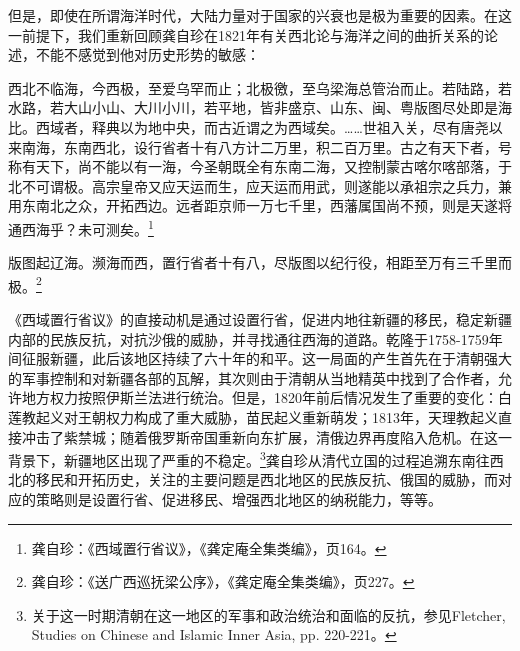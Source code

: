 \documentclass[a4paper, 12pt, openright]{ctexbook}
\renewenvironment{quote}
  {\list{}{\rightmargin2\ccwd \leftmargin2\ccwd \itemindent=2\ccwd \listparindent=2\ccwd}%
   \item\relax\small\kaishu\color{black}}
  {\endlist}
\begin{document}
但是，即使在所谓海洋时代，大陆力量对于国家的兴衰也是极为重要的因素。在这一前提下，我们重新回顾龚自珍在1821年有关西北论与海洋之间的曲折关系的论述，不能不感觉到他对历史形势的敏感：

\begin{quote}
西北不临海，今西极，至爱乌罕而止；北极徼，至乌梁海总管治而止。若陆路，若水路，若大山小山、大川小川，若平地，皆非盛京、山东、闽、粤版图尽处即是海比。西域者，释典以为地中央，而古近谓之为西域矣。……世祖入关，尽有唐尧以来南海，东南西北，设行省者十有八方计二万里，积二百万里。古之有天下者，号称有天下，尚不能以有一海，今圣朝既全有东南二海，又控制蒙古喀尔喀部落，于北不可谓极。高宗皇帝又应天运而生，应天运而用武，则遂能以承祖宗之兵力，兼用东南北之众，开拓西边。远者距京师一万七千里，西藩属国尚不预，则是天遂将通西海乎？未可测矣。\footnote{龚自珍：《西域置行省议》，《龚定庵全集类编》，页164。}
\end{quote}

\begin{quote}
版图起辽海。濒海而西，置行省者十有八，尽版图以纪行役，相距至万有三千里而极。\footnote{龚自珍：《送广西巡抚梁公序》，《龚定庵全集类编》，页227。}
\end{quote}

《西域置行省议》的直接动机是通过设置行省，促进内地往新疆的移民，稳定新疆内部的民族反抗，对抗沙俄的威胁，并寻找通往西海的道路。乾隆于1758-1759年间征服新疆，此后该地区持续了六十年的和平。这一局面的产生首先在于清朝强大的军事控制和对新疆各部的瓦解，其次则由于清朝从当地精英中找到了合作者，允许地方权力按照伊斯兰法进行统治。但是，1820年前后情况发生了重要的变化：白莲教起义对王朝权力构成了重大威胁，苗民起义重新萌发；1813年，天理教起义直接冲击了紫禁城；随着俄罗斯帝国重新向东扩展，清俄边界再度陷入危机。在这一背景下，新疆地区出现了严重的不稳定。\footnote{关于这一时期清朝在这一地区的军事和政治统治和面临的反抗，参见Fletcher, Studies on Chinese and Islamic Inner Asia, pp. 220-221。}龚自珍从清代立国的过程追溯东南往西北的移民和开拓历史，关注的主要问题是西北地区的民族反抗、俄国的威胁，而对应的策略则是设置行省、促进移民、增强西北地区的纳税能力，等等。
\end{document}
